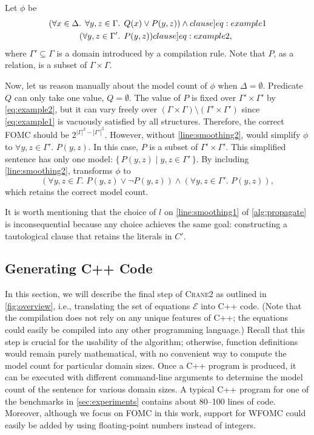 \documentclass[a4paper,UKenglish,cleveref,autoref]{lipics-v2021}
\newcommand{\Cranetwo}{\textsc{Crane2}}
\begin{document}
\begin{example}\label{example:basecasesmoothing}
  Let $\phi$ be
  \begin{align}
    (\forall x \in \Delta\text{. }\forall y, z \in \Gamma&\text{. }Q(x) \lor P(y, z))\land{}\label[clause]{eq:example1}\\
    (\forall y, z \in \Gamma'&\text{. }P(y, z))\label[clause]{eq:example2},
  \end{align}
  where $\Gamma' \subseteq \Gamma$ is a domain introduced by a compilation rule.
  Note that $P$, as a relation, is a subset of $\Gamma \times \Gamma$.

  Now, let us reason manually about the model count of $\phi$ when
  $\Delta = \emptyset$. Predicate $Q$ can only take one value, $Q = \emptyset$.
  The value of $P$ is fixed over $\Gamma' \times \Gamma'$ by \cref{eq:example2},
  but it can vary freely over
  $(\Gamma \times \Gamma) \setminus (\Gamma' \times \Gamma')$ since
  \cref{eq:example1} is vacuously satisfied by all structures. Therefore, the
  correct FOMC should be $2^{|\Gamma|^2 - |\Gamma'|^2}$. However, without
  \autoref{line:smoothing2}, \Propagate would simplify $\phi$ to
  $\forall y, z \in \Gamma'\text{. }P(y, z)$. In this case, $P$ is a subset of
  $\Gamma' \times \Gamma'$. This simplified sentence has only one model:
  $\{\, P(y, z) \mid y, z \in \Gamma' \,\}$. By including
  \autoref{line:smoothing2}, \Propagate transforms $\phi$ to
  \[
    (\forall y, z \in \Gamma\text{. }P(y, z) \lor \neg P(y, z)) \land (\forall y, z \in \Gamma'\text{. }P(y, z)),
  \]
  which retains the correct model count.
\end{example}

It is worth mentioning that the choice of $l$ on \autoref{line:smoothing1} of
\cref{alg:propagate} is inconsequential because any choice achieves the same
goal: constructing a tautological clause that retains the literals in $C'$.

\subsection{Generating C++ Code}\label{sec:cpp}

In this section, we will describe the final step of \Cranetwo{} as outlined in
\cref{fig:overview}, i.e., translating the set of equations $\mathcal{E}$ into
C++ code. (Note that the compilation does not rely on any unique features of
C++; the equations could easily be compiled into any other programming
language.) Recall that this step is crucial for the usability of the algorithm;
otherwise, function definitions would remain purely mathematical, with no
convenient way to compute the model count for particular domain sizes. Once a
C++ program is produced, it can be executed with different command-line
arguments to determine the model count of the sentence for various domain sizes.
A typical C++ program for one of the benchmarks in \cref{sec:experiments}
contains about \numrange{80}{100} lines of code. Moreover, although we focus on
FOMC in this work, support for WFOMC could easily be added by using
floating-point numbers instead of integers.
\end{document}
